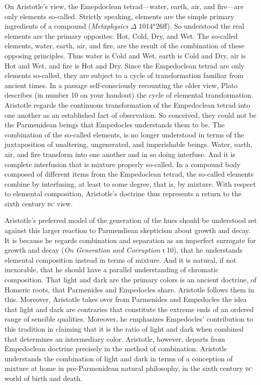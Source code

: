On Aristotle's view, the Emepdoclean tetrad---water, earth, air, and fire---are only elements so-called. Strictly speaking, elements are the simple primary ingredients of a compound (\emph{Metaphysics} \( \Delta \) 1014\( ^{a} \)26ff). So understood the real elements are the primary opposites: Hot, Cold, Dry, and Wet. The so-called elements, water, earth, air, and fire, are the result of the combination of these opposing principles. Thus water is Cold and Wet, earth is Cold and Dry, air is Hot and Wet, and fire is Hot and Dry. Since the Empedoclean tetrad are only elements so-called, they are subject to a cycle of transformation familiar from ancient times. 
In a passage self-consciously recounting the older view, Plato describes  (in number 10 on your handout) the cycle of elemental transformation. Aristotle regards the continuous transformation of the Empedoclean tetrad into one another as an established fact of observation. So conceived, they could not be the Parmenidean beings that Empedocles understands them to be. The combination of the so-called elements, is no longer understood in terms of the juxtaposition of unaltering, ungenerated, and imperishable beings. Water, earth, air, and fire transform into one another and in so doing interfuse. And it is complete interfusion that is mixture properly so-called. In a compound body composed of different items from the Empedoclean tetrad, the so-called elements combine by interfusing, at least to some degree, that is, by mixture. With respect to elemental composition, Aristotle's doctrine thus represents a return to the sixth century \textsc{bc} view.

Aristotle's preferred model of the generation of the hues should be understood set against this larger reaction to Parmendiean skepticism about growth and decay. It is because he regards combination and separation as an imperfect surrogate for growth and decay (\emph{On Generation and Corruption} \textsc{i} 10), that he understands elemental composition instead in terms of mixture. And it is natural, if not inexorable, that he should have a parallel understanding of chromatic composition. That light and dark are the primary colors is an ancient doctrine, of Homeric roots, that Parmenides and Empedocles share. Aristotle follows them in this. Moreover, Aristotle takes over from Parmenides and Empedocles the idea that light and dark are contraries that constitute the extreme ends of an ordered range of sensible qualities. Moreover, he emphasizes Empedocles' contribution to this tradition in claiming that it is the ratio of light and dark when combined that determines an intermediary color. Aristotle, however, departs from Empedoclean doctrine precisely in the method of combination. Aristotle understands the combination of light and dark in terms of a conception of mixture at home in pre-Parmenidean natural philosophy, in the sixth century \textsc{bc} world of birth and death. 

